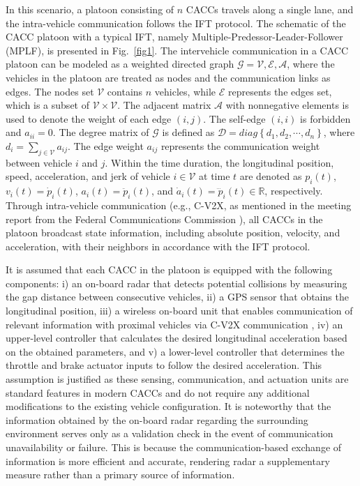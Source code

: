 \documentclass[a4paper]{cas-sc}
\begin{document}
In this scenario, a platoon consisting of $n$ CACCs travels along a single lane, and the intra-vehicle communication follows the IFT protocol. The schematic of the CACC platoon with a typical IFT, namely Multiple-Predessor-Leader-Follower (MPLF), is presented in Fig.~\ref{fig1}.  The intervehicle communication in a CACC platoon can be modeled as a weighted directed graph $\mathcal{G}={\mathcal{V},\mathcal{E},\mathcal{A}}$, where the vehicles in the platoon are treated as nodes and the communication links as edges. The nodes set $\mathcal{V}$ contains $n$ vehicles, while $\mathcal{E}$ represents the edges set, which is a subset of $\mathcal{V} \times \mathcal{V}$. The adjacent matrix $\mathcal{A}$ with nonnegative elements is used to denote the weight of each edge $\left( {i,j} \right)$. The self-edge $\left( {i,i} \right)$ is forbidden and ${a_{ii}} = 0$. The degree matrix of $\mathcal{G}$ is defined as $\mathcal{D} = diag\left\{ {{d_1},{d_2}, \cdots ,{d_n}} \right\}$, where ${d_i} = \sum\limits_{j \in \mathcal{V}} {{a_{ij}}}$. The edge weight ${a_{ij}}$ represents the communication weight between vehicle $i$ and $j$. Within the time duration, the longitudinal position, speed, acceleration, and jerk of vehicle $i \in \mathcal{V}$ at time $t$ are denoted as $p_i\left(t\right)$, $v_i\left(t\right)={\dot{p}}_i\left(t\right)$, $a_i\left(t\right)={\ddot{p}}_i\left(t\right)$, and ${\dot{a}}_i\left(t\right)={\dddot{p}}_i\left(t\right) \in \mathbb{R}$, respectively. Through intra-vehicle communication (e.g., C-V2X, as mentioned in the meeting report from the Federal Communications Commission \citep{popeo2020federal}), all CACCs in the platoon broadcast state information, including absolute position, velocity, and acceleration, with their neighbors in accordance with the IFT protocol.


It is assumed that each CACC in the platoon is equipped with the following components: i) an on-board radar that detects potential collisions by measuring the gap distance between consecutive vehicles, ii) a GPS sensor that obtains the longitudinal position, iii) a wireless on-board unit that enables communication of relevant information with proximal vehicles via C-V2X communication \citep{VerizonNorth2020}, iv) an upper-level controller that calculates the desired longitudinal acceleration based on the obtained parameters, and v) a lower-level controller that determines the throttle and brake actuator inputs to follow the desired acceleration. This assumption is justified as these sensing, communication, and actuation units are standard features in modern CACCs and do not require any additional modifications to the existing vehicle configuration. It is noteworthy that the information obtained by the on-board radar regarding the surrounding environment serves only as a validation check in the event of communication unavailability or failure. This is because the communication-based exchange of information is more efficient and accurate, rendering radar a supplementary measure rather than a primary source of information.
\end{document}
